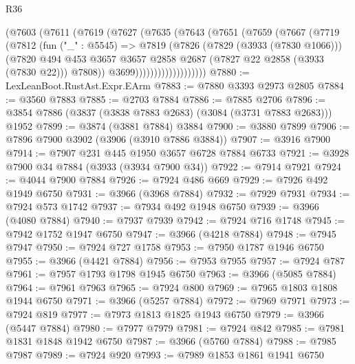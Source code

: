 \begin{lexlean}{R36}
\begin{coremodule}
                  (@7603
                    (@7611
                      (@7619
                        (@7627
                          (@7635
                            (@7643
                              (@7651
                                (@7659
                                  (@7667
                                    (@7719
                                      (@7812
                                        (fun ("_" : @5545) =>
                                        @7819
                                          (@7826
                                            (@7829 (@3933 (@7830 @1066)))
                                            (@7820
                                              @494
                                              @453
                                              @3657
                                              @3657
                                              @2858
                                              @2687
                                              (@7827 @22 @2858 (@3933 (@7830 @22)))
                                              @7808))
                                          @3699)))))))))))))))))))
@7880 := LexLeanBoot.RustAst.Expr.EArm
@7883 := @7880 @3393 @2973 @2805
@7884 := @3560 @7883
@7885 := @2703 @7884
@7886 := @7885 @2706
@7896 := @3854 @7886 (@3837 (@3838 @7883 @2683) (@3084 (@3731 @7883 @2683))) @1952
@7899 := @3874 (@3881 @7884) @3884
@7900 := @3880 @7899
@7906 := @7896 @7900 @3902 (@3906 (@3910 @7886 @3884))
@7907 := @3916 @7900
@7914 := @7907 @231 @445 @1950 @3657 @6728 @7884 @6733
@7921 := @3928 @7900 @34 @7884 (@3933 (@3934 @7900 @34))
@7922 := @7914 @7921
@7924 := @4044 @7900 @7884
@7926 := @7924 @486 @669
@7929 := @7926 @492 @1949 @6750
@7931 := @3966 (@3968 @7884)
@7932 := @7929 @7931
@7934 := @7924 @573 @1742
@7937 := @7934 @492 @1948 @6750
@7939 := @3966 (@4080 @7884)
@7940 := @7937 @7939
@7942 := @7924 @716 @1748
@7945 := @7942 @1752 @1947 @6750
@7947 := @3966 (@4218 @7884)
@7948 := @7945 @7947
@7950 := @7924 @727 @1758
@7953 := @7950 @1787 @1946 @6750
@7955 := @3966 (@4421 @7884)
@7956 := @7953 @7955
@7957 := @7924 @787
@7961 := @7957 @1793 @1798 @1945 @6750
@7963 := @3966 (@5085 @7884)
@7964 := @7961 @7963
@7965 := @7924 @800
@7969 := @7965 @1803 @1808 @1944 @6750
@7971 := @3966 (@5257 @7884)
@7972 := @7969 @7971
@7973 := @7924 @819
@7977 := @7973 @1813 @1825 @1943 @6750
@7979 := @3966 (@5447 @7884)
@7980 := @7977 @7979
@7981 := @7924 @842
@7985 := @7981 @1831 @1848 @1942 @6750
@7987 := @3966 (@5760 @7884)
@7988 := @7985 @7987
@7989 := @7924 @920
@7993 := @7989 @1853 @1861 @1941 @6750

\end{coremodule}
\end{lexlean}
